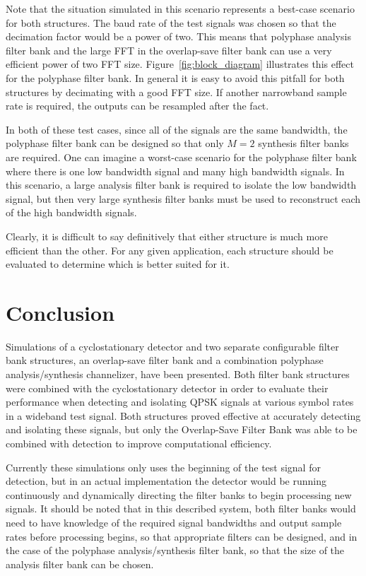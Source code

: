 \documentclass[12pt]{article}
\begin{document}
Note that the situation simulated in this scenario represents a best-case
scenario for both structures. The baud rate of the test signals was chosen so
that the decimation factor would be a power of two. This means that polyphase
analysis filter bank and the large FFT in the overlap-save filter bank can use
a very efficient power of two FFT size. Figure~\ref{fig:block_diagram}
illustrates this effect for the polyphase filter bank. In general it is easy to
avoid this pitfall for both structures by decimating with a good FFT size. If
another narrowband sample rate is required, the outputs can be resampled after
the fact.

In both of these test cases, since all of the signals are the same bandwidth,
the polyphase filter bank can be designed so that only $M=2$ synthesis filter
banks are required.  One can imagine a worst-case scenario for the polyphase
filter bank where there is one low bandwidth signal and many high
bandwidth signals.  In this scenario, a large analysis filter bank is required
to isolate the low bandwidth signal, but then very large synthesis filter banks
must be used to reconstruct each of the high bandwidth signals.

Clearly, it is difficult to say definitively that either structure is much more
efficient than the other. For any given application, each structure should be
evaluated to determine which is better suited for it.


\section{Conclusion}
\label{sec:conclusion}
Simulations of a cyclostationary detector and two separate configurable filter
bank structures, an overlap-save filter bank and a combination polyphase
analysis/synthesis channelizer, have been presented. Both filter bank
structures were combined with the cyclostationary detector in order to evaluate
their performance when detecting and isolating QPSK signals at various symbol
rates in a wideband test signal. Both structures proved effective at accurately
detecting and isolating these signals, but only the Overlap-Save Filter Bank
was able to be combined with detection to improve computational efficiency.

Currently these simulations only uses the beginning of the test signal for
detection, but in an actual implementation the detector would be running
continuously and dynamically directing the filter banks to begin processing new
signals. It should be noted that in this described system, both filter banks would
need to have knowledge of the required signal bandwidths and output sample
rates before processing begins, so that appropriate filters can be designed, and
in the case of the polyphase analysis/synthesis filter bank, so that the size
of the analysis filter bank can be chosen.
\end{document}
